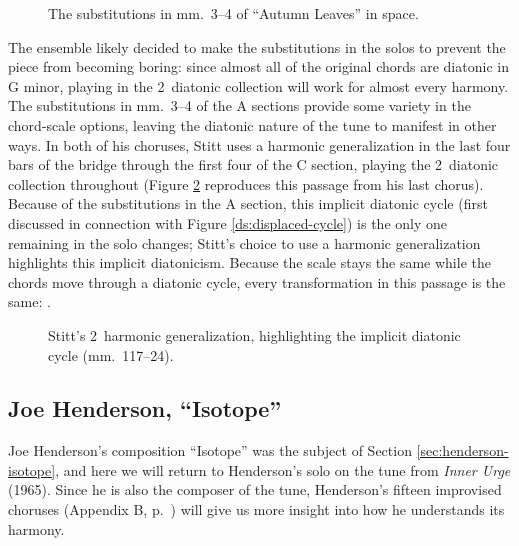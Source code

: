 \begin{figure}[tbp]
  \caption{The substitutions in mm.~3--4 of ``Autumn Leaves'' in \tf space.}
  \label{csa:al-subs-space}
\end{figure}

The ensemble likely decided to make the substitutions in the solos to prevent
the piece from becoming boring: since almost all of the original chords are
diatonic in G minor, playing in the 2\flat\ diatonic collection will work for
almost every harmony. The substitutions in mm.~3--4 of the A
sections provide some variety in the chord-scale options, leaving the diatonic
nature of the tune to manifest in other ways. In both of his choruses, Stitt
uses a harmonic generalization in the last four bars of the bridge through the
first four of the C section, playing the 2\flat\ diatonic collection
throughout (Figure \ref{csa:stitt-diatonic-generalization} reproduces this
passage from his last chorus). Because of the substitutions in the A section,
this implicit diatonic cycle (first discussed in connection with Figure
\ref{ds:displaced-cycle}) is the only one remaining in the solo changes;
Stitt's choice to use a harmonic generalization highlights this implicit
diatonicism. Because the scale stays the same while the chords move
through a diatonic cycle, every transformation in this passage is the same:
.

\begin{figure}[tbp]
  \caption[Stitt's 2\flat\ harmonic generalization, highlighting the implicit
    diatonic cycle.]{Stitt's 2\kern1pt\flat\ harmonic generalization,
    highlighting the implicit diatonic cycle (mm.~117--24).}
  \label{csa:stitt-diatonic-generalization}
\end{figure}

\subsection{Joe Henderson, “Isotope”}
\label{subsec:isotope-solo}

Joe Henderson's composition ``Isotope'' was the subject of Section
\ref{sec:henderson-isotope}, and here we will return to Henderson's solo on
the tune from \emph{Inner Urge} (1965). Since he is also the composer of the
tune, Henderson's fifteen improvised choruses (Appendix B,
p.~\pageref{transcription:isotope}) will give us more insight into how he
understands its harmony.

